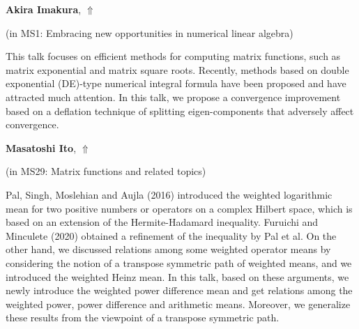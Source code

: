 \documentclass[ILAS2025-program.tex]{subfiles}
\begin{document}
\hypertarget{down0349}{}\begin{ilasabstract}
    
\textbf{Akira Imakura},  \hfill \hyperlink{up0349}{$\Uparrow$}
    
    
(in {\color{mstitle}MS1: Embracing new opportunities in numerical linear algebra})
        
\mtskip
    This talk focuses on efficient methods for computing matrix functions, such as matrix exponential and matrix square roots.
Recently, methods based on double exponential (DE)-type numerical integral formula have been proposed and have attracted much attention.
In this talk, we propose a convergence improvement based on a deflation technique of splitting eigen-components that adversely affect convergence.
\end{ilasabstract}
    

\hypertarget{down0046}{}\begin{ilasabstract}
    
\textbf{Masatoshi Ito},  \hfill \hyperlink{up0046}{$\Uparrow$}
    
    
(in {\color{mstitle}MS29: Matrix functions and related topics})
        
\mtskip
    Pal, Singh, Moslehian and Aujla (2016) introduced the weighted logarithmic mean for two positive numbers
 or operators on a complex Hilbert space, which is based on an extension of the Hermite-Hadamard inequality.
Furuichi and Minculete (2020) obtained a refinement of the inequality by Pal et al.
On the other hand, we discussed relations among some weighted operator means
 by considering the notion of a transpose symmetric path of weighted means,
 and we introduced the weighted Heinz mean.
In this talk, based on these arguments,
 we  newly introduce the weighted power difference mean and get relations
 among the weighted power, power difference and arithmetic means.
Moreover, we generalize these results from the viewpoint of a transpose symmetric path.


\end{ilasabstract}
    
\end{document}
